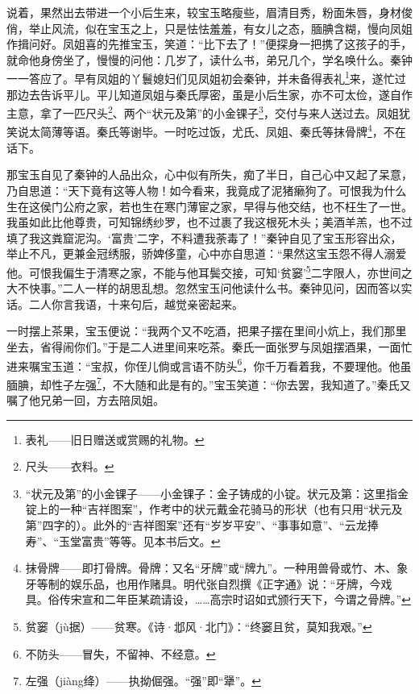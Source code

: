 \par 说着，果然出去带进一个小后生来，较宝玉略瘦些，眉清目秀，粉面朱唇，身材俊俏，举止风流，似在宝玉之上，只是怯怯羞羞，有女儿之态，腼腆含糊，慢向凤姐作揖问好。凤姐喜的先推宝玉，笑道：“比下去了！”便探身一把携了这孩子的手，就命他身傍坐了，慢慢的问他：几岁了，读什么书，弟兄几个，学名唤什么。秦钟一一答应了。早有凤姐的丫鬟媳妇们见凤姐初会秦钟，并未备得表礼\footnote{表礼——旧日赠送或赏赐的礼物。}来，遂忙过那边去告诉平儿。平儿知道凤姐与秦氏厚密，虽是小后生家，亦不可太俭，遂自作主意，拿了一匹尺头\footnote{尺头——衣料。}、两个“状元及第”的小金锞子\footnote{“状元及第”的小金锞子——小金锞子：金子铸成的小锭。状元及第：这里指金锭上的一种“吉祥图案”，作考中的状元戴金花骑马的形状（也有只用“状元及第”四字的）。此外的“吉祥图案”还有“岁岁平安”、“事事如意”、“云龙捧寿”、“玉堂富贵”等等。见本书后文。}，交付与来人送过去。凤姐犹笑说太简薄等语。秦氏等谢毕。一时吃过饭，尤氏、凤姐、秦氏等抹骨牌\footnote{抹骨牌——即打骨牌。骨牌：又名“牙牌”或“牌九”。一种用兽骨或竹、木、象牙等制的娱乐品，也用作赌具。明代张自烈撰《正字通》说：“牙牌，今戏具。俗传宋宣和二年臣某疏请设，……高宗时诏如式颁行天下，今谓之骨牌。”}，不在话下。
\par 那宝玉自见了秦钟的人品出众，心中似有所失，痴了半日，自己心中又起了呆意，乃自思道：“天下竟有这等人物！如今看来，我竟成了泥猪癞狗了。可恨我为什么生在这侯门公府之家，若也生在寒门薄宦之家，早得与他交结，也不枉生了一世。我虽如此比他尊贵，可知锦绣纱罗，也不过裹了我这根死木头；美酒羊羔，也不过填了我这粪窟泥沟。‘富贵’二字，不料遭我荼毒了！”秦钟自见了宝玉形容出众，举止不凡，更兼金冠绣服，骄婢侈童，心中亦自思道：“果然这宝玉怨不得人溺爱他。可恨我偏生于清寒之家，不能与他耳鬓交接，可知‘贫窭’\footnote{贫窭（jù据）——贫寒。《诗·邶风·北门》：“终窭且贫，莫知我艰。”}二字限人，亦世间之大不快事。”二人一样的胡思乱想。忽然宝玉问他读什么书。秦钟见问，因而答以实话。二人你言我语，十来句后，越觉亲密起来。
\par 一时摆上茶果，宝玉便说：“我两个又不吃酒，把果子摆在里间小炕上，我们那里坐去，省得闹你们。”于是二人进里间来吃茶。秦氏一面张罗与凤姐摆酒果，一面忙进来嘱宝玉道：“宝叔，你侄儿倘或言语不防头\footnote{不防头——冒失，不留神、不经意。}，你千万看着我，不要理他。他虽腼腆，却性子左强\footnote{左强（jiàng绛）——执拗倔强。“强”即“犟”。}，不大随和此是有的。”宝玉笑道：“你去罢，我知道了。”秦氏又嘱了他兄弟一回，方去陪凤姐。
